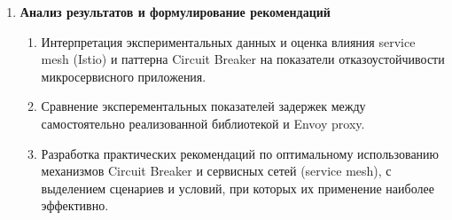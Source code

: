 \begin{enumerate}
      \item \textbf{Анализ результатов и формулирование рекомендаций}
      \begin{enumerate}
        \item Интерпретация экспериментальных данных и оценка влияния service mesh (Istio) и паттерна Circuit Breaker на показатели отказоустойчивости микросервисного приложения.
        \item Сравнение эксперементальных  показателей задержек между самостоятельно реализованной библиотекой и Envoy proxy.
        \item Разработка практических рекомендаций по оптимальному использованию механизмов Circuit Breaker и сервисных сетей (service mesh), с выделением сценариев и условий, при которых их применение наиболее эффективно.
      \end{enumerate}
    \end{enumerate}


